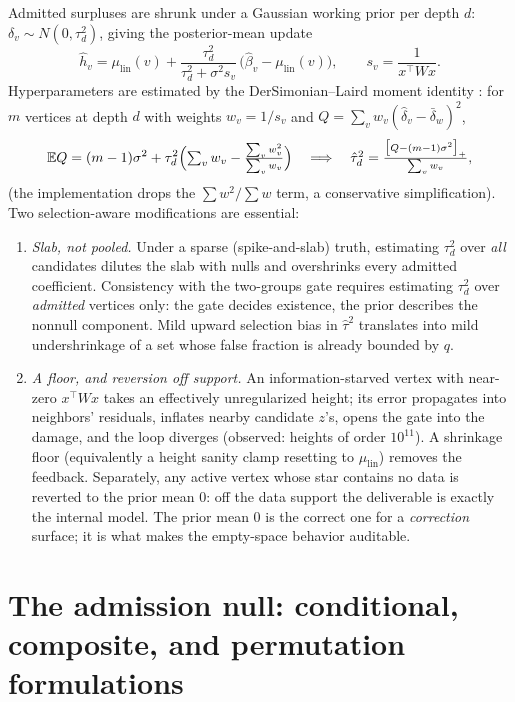 \documentclass[11pt]{article}
\newcommand{\E}{\mathbb{E}}
\begin{document}
Admitted surpluses are shrunk under a Gaussian working prior per depth $d$:
$\delta_v\sim N(0,\tau_d^2)$, giving the posterior-mean update
\begin{equation}
\hat h_v=\mu_{\mathrm{lin}}(v)+\frac{\tau_d^2}{\tau_d^2+\sigma^2 s_v}\,
\bigl(\hat\beta_v-\mu_{\mathrm{lin}}(v)\bigr),\qquad s_v=\frac{1}{x^\top Wx}.
\end{equation}
Hyperparameters are estimated by the DerSimonian--Laird moment identity
\cite{dl1986}: for $m$ vertices at depth $d$ with weights $w_v=1/s_v$ and
$Q=\sum_v w_v(\hat\delta_v-\bar\delta_w)^2$,
\begin{equation}\label{eq:dl}
\E Q=(m-1)\sigma^2+\tau_d^2\Bigl(\textstyle\sum_v w_v-\frac{\sum_v w_v^2}{\sum_v w_v}\Bigr)
\quad\Longrightarrow\quad
\hat\tau_d^2=\frac{\bigl[Q-(m-1)\sigma^2\bigr]_+}{\sum_v w_v} ,
\end{equation}
(the implementation drops the $\sum w^2/\sum w$ term, a conservative simplification).
Two selection-aware modifications are essential:

\begin{enumerate}[leftmargin=2em]
\item \emph{Slab, not pooled.} Under a sparse (spike-and-slab) truth, estimating
$\tau_d^2$ over \emph{all} candidates dilutes the slab with nulls and overshrinks every
admitted coefficient. Consistency with the two-groups gate requires estimating
$\tau_d^2$ over \emph{admitted} vertices only: the gate decides existence, the prior
describes the nonnull component. Mild upward selection bias in $\hat\tau^2$ translates
into mild undershrinkage of a set whose false fraction is already bounded by $q$.
\item \emph{A floor, and reversion off support.} An information-starved vertex with
near-zero $x^\top Wx$ takes an effectively unregularized height; its error propagates
into neighbors' residuals, inflates nearby candidate $z$'s, opens the gate into the
damage, and the loop diverges (observed: heights of order $10^{11}$). A shrinkage floor
(equivalently a height sanity clamp resetting to $\mu_{\mathrm{lin}}$) removes the
feedback. Separately, any active vertex whose star contains no data is reverted to the
prior mean $0$: off the data support the deliverable is exactly the internal model.
The prior mean $0$ is the correct one for a \emph{correction} surface; it is what makes
the empty-space behavior auditable.
\end{enumerate}


\section{The admission null: conditional, composite, and permutation formulations}\label{sec:nulls}
\end{document}
